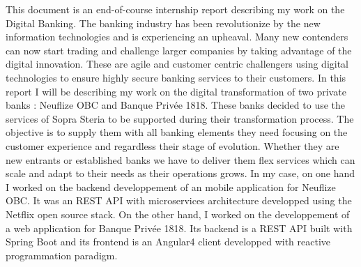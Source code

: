 	This document is an end-of-course internship report describing my work on the Digital Banking. The banking industry has been revolutionize by the new information technologies and is experiencing an upheaval. Many new contenders can now start trading and challenge larger companies by taking advantage of the digital innovation. These are agile and customer centric challengers using digital technologies to ensure highly secure banking services to their customers. In this report I will be describing my work on the digital transformation of two private banks : Neuflize OBC and Banque Privée 1818. These banks decided to use the services of Sopra Steria to be supported during their transformation process. The objective is to supply them with all banking elements they need focusing on the customer experience and regardless their stage of evolution. Whether they are new entrants or established banks we have to deliver them flex services which can scale and adapt to their needs as their operations grows. In my case, on one hand I worked on the backend developpement of an mobile application for Neuflize OBC. It was an REST API with microservices architecture developped using the Netflix open source stack. On the other hand, I worked on the developpement of a web application for Banque Privée 1818. Its backend is a REST API built with Spring Boot and its frontend is an Angular4 client developped with reactive programmation paradigm.